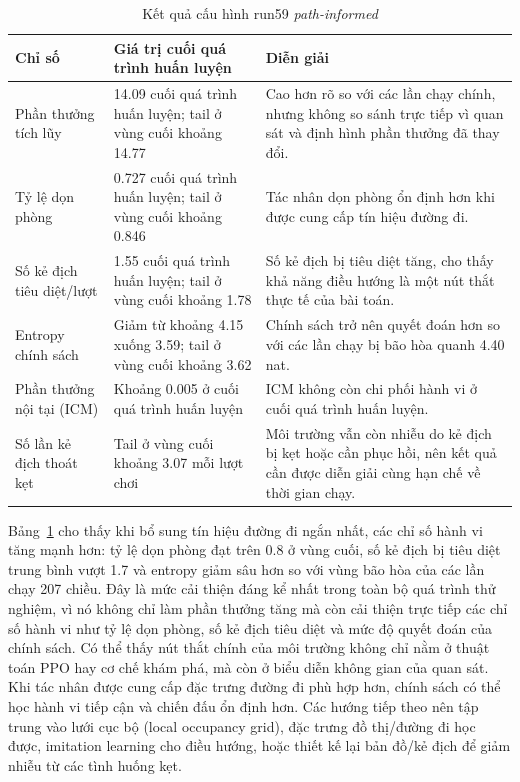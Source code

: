 \begin{table}[H]
    \centering
    \small
    \caption{Kết quả cấu hình run59 \emph{path-informed}}
    \label{tab:run59_bfs_assisted}
    \begin{tabular}{|p{4.1cm}|p{3.2cm}|p{6.4cm}|}
        \hline
        \textbf{Chỉ số} & \textbf{Giá trị cuối quá trình huấn luyện} & \textbf{Diễn giải} \\
        \hline
        Phần thưởng tích lũy & 14.09 cuối quá trình huấn luyện; tail ở vùng cuối khoảng 14.77 & Cao hơn rõ so với các lần chạy chính, nhưng không so sánh trực tiếp vì quan sát và định hình phần thưởng đã thay đổi. \\
        \hline
        Tỷ lệ dọn phòng & 0.727 cuối quá trình huấn luyện; tail ở vùng cuối khoảng 0.846 & Tác nhân dọn phòng ổn định hơn khi được cung cấp tín hiệu đường đi. \\
        \hline
        Số kẻ địch tiêu diệt/lượt & 1.55 cuối quá trình huấn luyện; tail ở vùng cuối khoảng 1.78 & Số kẻ địch bị tiêu diệt tăng, cho thấy khả năng điều hướng là một nút thắt thực tế của bài toán. \\
        \hline
        Entropy chính sách & Giảm từ khoảng 4.15 xuống 3.59; tail ở vùng cuối khoảng 3.62 & Chính sách trở nên quyết đoán hơn so với các lần chạy bị bão hòa quanh 4.40 nat. \\
        \hline
        Phần thưởng nội tại (ICM) & Khoảng 0.005 ở cuối quá trình huấn luyện & ICM không còn chi phối hành vi ở cuối quá trình huấn luyện. \\
        \hline
        Số lần kẻ địch thoát kẹt & Tail ở vùng cuối khoảng 3.07 mỗi lượt chơi & Môi trường vẫn còn nhiễu do kẻ địch bị kẹt hoặc cần phục hồi, nên kết quả cần được diễn giải cùng hạn chế về thời gian chạy. \\
        \hline
    \end{tabular}
\end{table}

Bảng~\ref{tab:run59_bfs_assisted} cho thấy khi bổ sung tín hiệu đường đi ngắn nhất, các chỉ số hành vi tăng mạnh hơn: tỷ lệ dọn phòng đạt trên 0.8 ở vùng cuối, số kẻ địch bị tiêu diệt trung bình vượt 1.7 và entropy giảm sâu hơn so với vùng bão hòa của các lần chạy 207 chiều. Đây là mức cải thiện đáng kể nhất trong toàn bộ quá trình thử nghiệm, vì nó không chỉ làm phần thưởng tăng mà còn cải thiện trực tiếp các chỉ số hành vi như tỷ lệ dọn phòng, số kẻ địch tiêu diệt và mức độ quyết đoán của chính sách. Có thể thấy nút thắt chính của môi trường không chỉ nằm ở thuật toán PPO hay cơ chế khám phá, mà còn ở biểu diễn không gian của quan sát. Khi tác nhân được cung cấp đặc trưng đường đi phù hợp hơn, chính sách có thể học hành vi tiếp cận và chiến đấu ổn định hơn. Các hướng tiếp theo nên tập trung vào lưới cục bộ (local occupancy grid), đặc trưng đồ thị/đường đi học được, imitation learning cho điều hướng, hoặc thiết kế lại bản đồ/kẻ địch để giảm nhiễu từ các tình huống kẹt.

